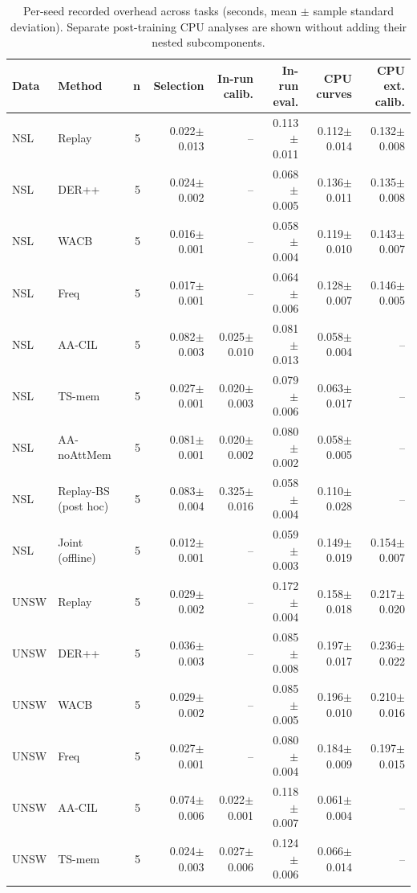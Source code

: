 \begin{table}[t]
\centering\scriptsize
\setlength{\tabcolsep}{3.8pt}
\caption{Per-seed recorded overhead across tasks (seconds, mean $\pm$ sample standard deviation). Separate post-training CPU analyses are shown without adding their nested subcomponents.}\label{tab:overhead-costs}
\begin{tabular}{llrrrrrr}
\toprule
Data & Method & n & Selection & In-run calib. & In-run eval. & CPU curves & CPU ext. calib. \\
\midrule
NSL & Replay & 5 & 0.022$\pm$0.013 & -- & 0.113$\pm$0.011 & 0.112$\pm$0.014 & 0.132$\pm$0.008 \\
NSL & DER++ & 5 & 0.024$\pm$0.002 & -- & 0.068$\pm$0.005 & 0.136$\pm$0.011 & 0.135$\pm$0.008 \\
NSL & WACB & 5 & 0.016$\pm$0.001 & -- & 0.058$\pm$0.004 & 0.119$\pm$0.010 & 0.143$\pm$0.007 \\
NSL & Freq & 5 & 0.017$\pm$0.001 & -- & 0.064$\pm$0.006 & 0.128$\pm$0.007 & 0.146$\pm$0.005 \\
NSL & AA-CIL & 5 & 0.082$\pm$0.003 & 0.025$\pm$0.010 & 0.081$\pm$0.013 & 0.058$\pm$0.004 & -- \\
NSL & TS-mem & 5 & 0.027$\pm$0.001 & 0.020$\pm$0.003 & 0.079$\pm$0.006 & 0.063$\pm$0.017 & -- \\
NSL & AA-noAttMem & 5 & 0.081$\pm$0.001 & 0.020$\pm$0.002 & 0.080$\pm$0.002 & 0.058$\pm$0.005 & -- \\
NSL & Replay-BS (post hoc) & 5 & 0.083$\pm$0.004 & 0.325$\pm$0.016 & 0.058$\pm$0.004 & 0.110$\pm$0.028 & -- \\
NSL & Joint (offline) & 5 & 0.012$\pm$0.001 & -- & 0.059$\pm$0.003 & 0.149$\pm$0.019 & 0.154$\pm$0.007 \\
UNSW & Replay & 5 & 0.029$\pm$0.002 & -- & 0.172$\pm$0.004 & 0.158$\pm$0.018 & 0.217$\pm$0.020 \\
UNSW & DER++ & 5 & 0.036$\pm$0.003 & -- & 0.085$\pm$0.008 & 0.197$\pm$0.017 & 0.236$\pm$0.022 \\
UNSW & WACB & 5 & 0.029$\pm$0.002 & -- & 0.085$\pm$0.005 & 0.196$\pm$0.010 & 0.210$\pm$0.016 \\
UNSW & Freq & 5 & 0.027$\pm$0.001 & -- & 0.080$\pm$0.004 & 0.184$\pm$0.009 & 0.197$\pm$0.015 \\
UNSW & AA-CIL & 5 & 0.074$\pm$0.006 & 0.022$\pm$0.001 & 0.118$\pm$0.007 & 0.061$\pm$0.004 & -- \\
UNSW & TS-mem & 5 & 0.024$\pm$0.003 & 0.027$\pm$0.006 & 0.124$\pm$0.006 & 0.066$\pm$0.014 & -- \\

\end{tabular}
\end{table}
